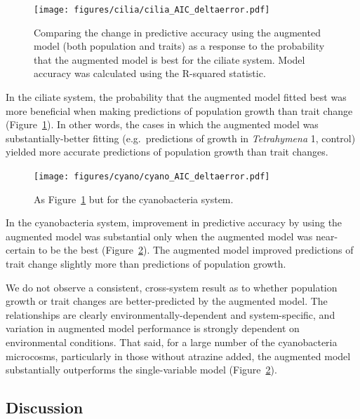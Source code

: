 \documentclass[
  letterpaper,
  DIV=11,
  numbers=noendperiod]{scrartcl}
\begin{document}
\begin{figure}

{\centering \texttt{[image: figures/cilia/cilia\_AIC\_deltaerror.pdf]}

}

\caption{\label{fig-cilia_AIC_deltaerror}Comparing the change in
predictive accuracy using the augmented model (both population and
traits) as a response to the probability that the augmented model is
best for the ciliate system. Model accuracy was calculated using the
R-squared statistic.}

\end{figure}

In the ciliate system, the probability that the augmented model fitted
best was more beneficial when making predictions of population growth
than trait change (Figure~\ref{fig-cilia_AIC_deltaerror}). In other
words, the cases in which the augmented model was substantially-better
fitting (e.g.~predictions of growth in \emph{Tetrahymena} 1, control)
yielded more accurate predictions of population growth than trait
changes.

\begin{figure}

{\centering \texttt{[image: figures/cyano/cyano\_AIC\_deltaerror.pdf]}

}

\caption{\label{fig-cyano_AIC_deltaerror}As
Figure~\ref{fig-cilia_AIC_deltaerror} but for the cyanobacteria system.}

\end{figure}

In the cyanobacteria system, improvement in predictive accuracy by using
the augmented model was substantial only when the augmented model was
near-certain to be the best (Figure~\ref{fig-cyano_AIC_deltaerror}). The
augmented model improved predictions of trait change slightly more than
predictions of population growth.

We do not observe a consistent, cross-system result as to whether
population growth or trait changes are better-predicted by the augmented
model. The relationships are clearly environmentally-dependent and
system-specific, and variation in augmented model performance is
strongly dependent on environmental conditions. That said, for a large
number of the cyanobacteria microcosms, particularly in those without
atrazine added, the augmented model substantially outperforms the
single-variable model (Figure~\ref{fig-cyano_AIC_deltaerror}).

\subsection{Discussion}\label{sec-DAE_discussion}
\end{document}
